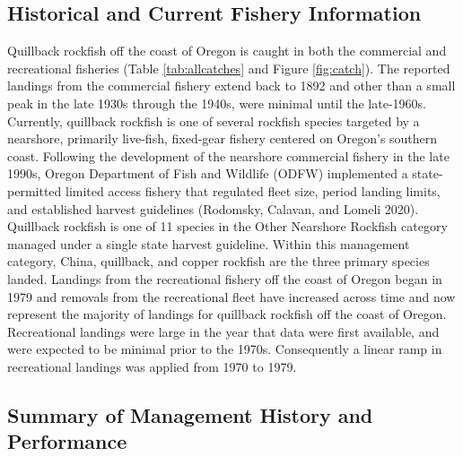 \documentclass[11pt,
  english,
  a4paper,
]{article}
\begin{document}

\hypertarget{historical-and-current-fishery-information}{%
\subsection{Historical and Current Fishery Information}\label{historical-and-current-fishery-information}}

\leavevmode\tagmcend\tagstructend


Quillback rockfish off the coast of Oregon is caught in both the commercial and recreational fisheries (Table \ref{tab:allcatches} and Figure \ref{fig:catch}). The reported landings from the commercial fishery extend back to 1892 and other than a small peak in the late 1930s through the 1940s, were minimal until the late-1960s. Currently, quillback rockfish is one of several rockfish species targeted by a nearshore, primarily live-fish, fixed-gear fishery centered on Oregon's southern coast. Following the development of the nearshore commercial fishery in the late 1990s, Oregon Department of Fish and Wildlife (ODFW) implemented a state-permitted limited access fishery that regulated fleet size, period landing limits, and established harvest guidelines {(Rodomsky, Calavan, and Lomeli 2020)\leavevmode\tagmcend\tagstructend}. Quillback rockfish is one of 11 species in the Other Nearshore Rockfish category managed under a single state harvest guideline. Within this management category, China, quillback, and copper rockfish are the three primary species landed. Landings from the recreational fishery off the coast of Oregon began in 1979 and removals from the recreational fleet have increased across time and now represent the majority of landings for quillback rockfish off the coast of Oregon. Recreational landings were large in the year that data were first available, and were expected to be minimal prior to the 1970s. Consequently a linear ramp in recreational landings was applied from 1970 to 1979.

\leavevmode\tagmcend\tagstructend\par


\hypertarget{summary-of-management-history-and-performance}{%
\subsection{Summary of Management History and Performance}\label{summary-of-management-history-and-performance}}
\end{document}
